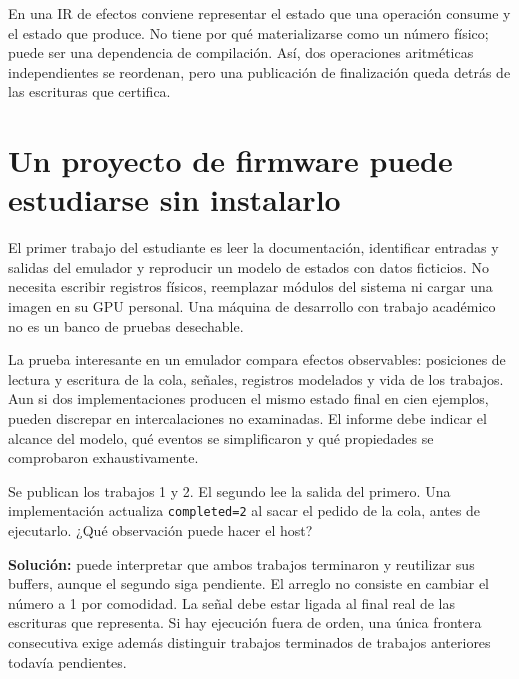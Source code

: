 \documentclass[12pt,a4paper,oneside]{report}
\begin{document}
En una IR de efectos conviene representar el estado que una operación consume y el estado que produce. No tiene por qué materializarse como un número físico; puede ser una dependencia de compilación. Así, dos operaciones aritméticas independientes se reordenan, pero una publicación de finalización queda detrás de las escrituras que certifica.

\begin{center}
\end{center}
\section{Un proyecto de firmware puede estudiarse sin instalarlo}
El primer trabajo del estudiante es leer la documentación, identificar entradas y salidas del emulador y reproducir un modelo de estados con datos ficticios. No necesita escribir registros físicos, reemplazar módulos del sistema ni cargar una imagen en su GPU personal. Una máquina de desarrollo con trabajo académico no es un banco de pruebas desechable.

La prueba interesante en un emulador compara efectos observables: posiciones de lectura y escritura de la cola, señales, registros modelados y vida de los trabajos. Aun si dos implementaciones producen el mismo estado final en cien ejemplos, pueden discrepar en intercalaciones no examinadas. El informe debe indicar el alcance del modelo, qué eventos se simplificaron y qué propiedades se comprobaron exhaustivamente.

\begin{practica}
Se publican los trabajos 1 y 2. El segundo lee la salida del primero. Una implementación actualiza \texttt{completed=2} al sacar el pedido de la cola, antes de ejecutarlo. ¿Qué observación puede hacer el host?

\textbf{Solución:} puede interpretar que ambos trabajos terminaron y reutilizar sus buffers, aunque el segundo siga pendiente. El arreglo no consiste en cambiar el número a 1 por comodidad. La señal debe estar ligada al final real de las escrituras que representa. Si hay ejecución fuera de orden, una única frontera consecutiva exige además distinguir trabajos terminados de trabajos anteriores todavía pendientes.

\end{practica}
\end{document}
